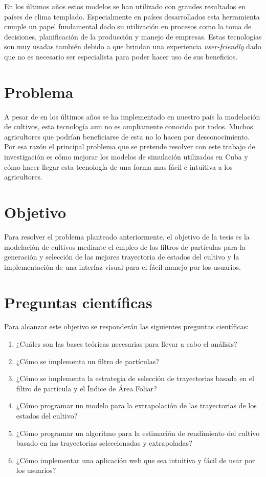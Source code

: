 En los últimos años estos modelos se han utilizado con grandes resultados en países de clima templado. Especialmente en países desarrollados esta herramienta cumple un papel fundamental dado su utilización en procesos como la toma de decisiones, planificación de la producción y manejo de empresas. Estas tecnologías son muy usadas también debido a que brindan una experiencia \textit{user-friendly} dado que no es necesario ser especialista para poder hacer uso de sus beneficios.


\section*{Problema}
A pesar de en los últimos años se ha implementado en nuestro país la modelación de cultivos, esta tecnología aun no es ampliamente conocida por todos. Muchos agricultores que podrían beneficiarse de esta no lo hacen por desconocimiento. Por esa razón el principal problema que se pretende resolver con este trabajo de investigación es cómo mejorar los modelos de simulación utilizados en Cuba y cómo hacer llegar esta tecnología de una forma mas fácil e intuitiva a los agricultores.

\section*{Objetivo}
Para resolver el problema planteado anteriormente, el objetivo de la tesis es la modelación de cultivos mediante el empleo de los filtros de partículas para la generación y selección de las mejores trayectoria de estados del cultivo y la implementación de una interfaz visual para el fácil manejo por los usuarios.

\section*{Preguntas científicas}
Para alcanzar este objetivo se responderán las siguientes preguntas científicas:

\begin{enumerate}
	\item ¿Cuáles son las bases teóricas necesarias para llevar a cabo el análisis?
	\item ¿Cómo se implementa un filtro de partículas?
	\item ¿Cómo se implementa la estrategia de selección de trayectorias basada en el filtro de partícula y el Índice de Área Foliar?
	\item ¿Cómo programar un modelo para la extrapolación de las trayectorias de los estados del cultivo?
	\item ¿Cómo programar un algoritmo para la estimación de rendimiento del cultivo basado en las trayectorias seleccionadas y extrapoladas?
	\item ¿Cómo implementar una aplicación web que sea intuitiva y fácil de usar por los usuarios?
\end{enumerate}

